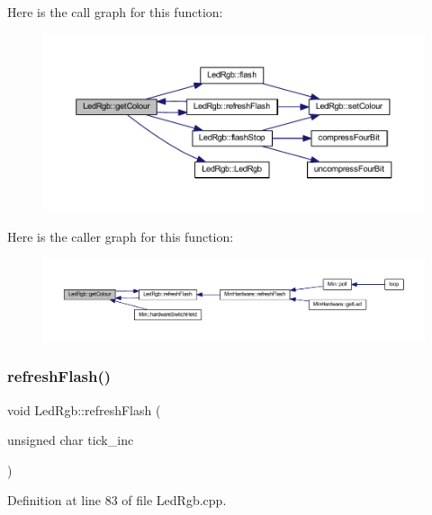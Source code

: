 Here is the call graph for this function\+:
\nopagebreak
\begin{figure}[H]
\begin{center}
\leavevmode
\includegraphics[width=350pt]{dc/d6d/class_led_rgb_a542e3bf6bcf1f05df3cc442522787948_cgraph}
\end{center}
\end{figure}
Here is the caller graph for this function\+:
\nopagebreak
\begin{figure}[H]
\begin{center}
\leavevmode
\includegraphics[width=350pt]{dc/d6d/class_led_rgb_a542e3bf6bcf1f05df3cc442522787948_icgraph}
\end{center}
\end{figure}
\mbox{\label{class_led_rgb_a31cf89e0117af309c00a60a7ca1bf486}} 
\subsubsection{\texorpdfstring{refresh\+Flash()}{refreshFlash()}}
{\footnotesize\ttfamily void Led\+Rgb\+::refresh\+Flash (\begin{DoxyParamCaption}\item[{unsigned char}]{tick\+\_\+inc }\end{DoxyParamCaption})}



Definition at line 83 of file Led\+Rgb.\+cpp.

